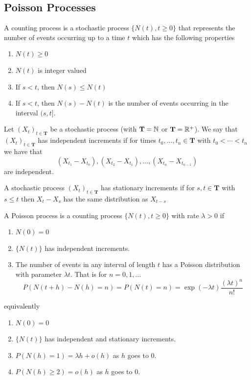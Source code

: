 \subsection{Poisson Processes}

\begin{defn} \cite{Ross_SP_95}
A counting process is a stochastic process $\{N(t), t \geq 0\}$ that represents the number of events occurring up to a time $t$ which has the following properties
\begin{enumerate}
    \item $N(t) \geq 0$
    \item $N(t)$ is integer valued
    \item If $s < t$, then $N(s) \leq N(t)$
    \item If $s < t$, then $N(s) - N(t)$ is the number of events occurring in the interval $(s, t]$.
\end{enumerate}
\end{defn}

\begin{defn}
Let $(X_t)_{t \in \mathbf T}$ be a stochastic process (with $\mathbf T = \mathbb{N}$ or $\mathbf T = \mathbb{R}^+$).
We say that $(X_t)_{t \in \mathbf T}$ has independent increments if for times $t_0, \ldots, t_n \in \mathbf T$ with $t_0 < \cdots < t_n$ we have that
$$
(X_{t_1} - X_{t_0}), (X_{t_2} - X_{t_1}), \ldots, (X_{t_n} - X_{t_{n - 1}})
$$
are independent.
\end{defn}

\begin{defn}
A stochastic process $(X_t)_{t \in \mathbf T}$ has stationary increments if for $s,t \in \mathbf{T}$ with $s \leq t$ then $X_t - X_s$ has the same distribution as $X_{t - s}$
\end{defn}

\begin{defn} \cite{Ross_SP_95}
A Poisson process is a counting process $\{N(t), t \geq 0\}$ with rate $\lambda > 0$ if
\begin{enumerate}
    \item $N(0) = 0$
    \item $\{N(t)\}$ has independent increments.
    \item The number of events in any interval of length $t$ has a Poisson distribution with parameter $\lambda t$. That is for $n = 0,1,\ldots$
    $$
    P(N(t + h) - N(h) = n) = P(N(t) = n) = \exp(-\lambda t) \frac{(\lambda t)^n}{n!}
    $$
\end{enumerate}

equivalently

\begin{enumerate}
    \item $N(0) = 0$
    \item $\{N(t)\}$ has independent and stationary increments.
    \item $P(N(h) = 1) = \lambda h + o(h)$ as $h$ goes to 0.
    \item $P(N(h) \geq 2) = o(h)$ as $h$ goes to 0.
\end{enumerate}
\end{defn}

